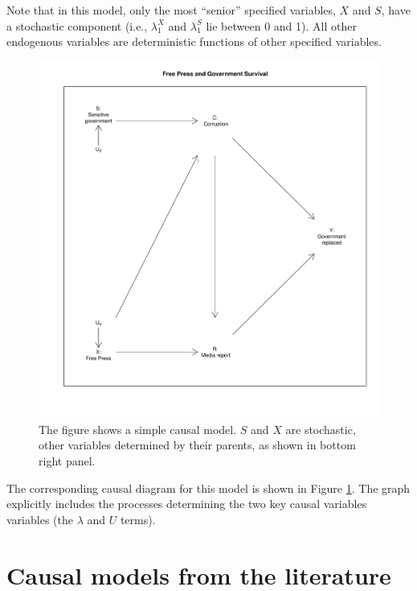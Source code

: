 \documentclass[12pt,]{book}
\begin{document}
Note that in this model, only the most ``senior'' specified variables, \(X\) and \(S\), have a stochastic component (i.e., \(\lambda^X_1\) and \(\lambda^S_1\) lie between 0 and 1). All other endogenous variables are deterministic functions of other specified variables.

\begin{figure}

{\centering \includegraphics[width=\textwidth]{ii_files/figure-latex/running-1} 

}

\caption{The figure shows a simple causal model. $S$ and $X$ are stochastic, other variables determined by their parents, as shown in bottom right panel.}\label{fig:running}
\end{figure}

The corresponding causal diagram for this model is shown in Figure \ref{fig:running}. The graph explicitly includes the processes determining the two key causal variables variables (the \(\lambda\) and \(U\) terms).

\hypertarget{causal-models-from-the-literature}{%
\section{Causal models from the literature}\label{causal-models-from-the-literature}}
\end{document}
